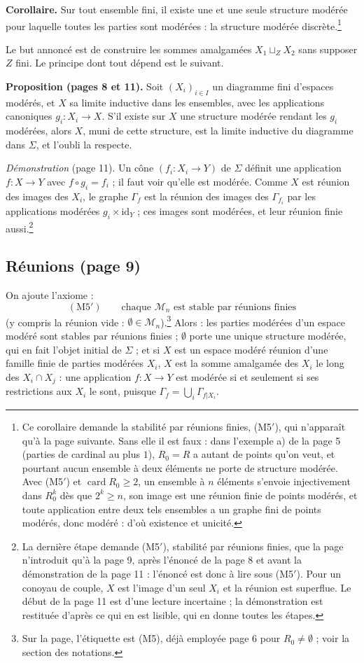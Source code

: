\documentclass[11pt,a4paper]{article}
\begin{document}
\textbf{Corollaire.} Sur tout ensemble fini, il existe une et une seule
structure modérée pour laquelle toutes les parties sont modérées : la
structure modérée discrète.\footnote{Ce corollaire demande la stabilité par
réunions finies, (M5$'$), qui n'apparaît qu'à la page suivante. Sans elle il
est faux : dans l'exemple a) de la page 5 (parties de cardinal au plus $1$),
$R_0 = R$ a autant de points qu'on veut, et pourtant aucun ensemble à deux
éléments ne porte de structure modérée. Avec (M5$'$) et $\operatorname{card}
R_0 \geqslant 2$, un ensemble à $n$ éléments s'envoie injectivement dans
$R_0^k$ dès que $2^k \geqslant n$, son image est une réunion finie de points
modérés, et toute application entre deux tels ensembles a un graphe fini de
points modérés, donc modéré : d'où existence et unicité.}

Le but annoncé est de construire les sommes amalgamées $X_1 \sqcup_Z X_2$ sans
supposer $Z$ fini. Le principe dont tout dépend est le suivant.

\textbf{Proposition (pages 8 et 11).} Soit $(X_i)_{i \in I}$ un diagramme fini
d'espaces modérés, et $X$ sa limite inductive dans les ensembles, avec les
applications canoniques $g_i : X_i \to X$. S'il existe sur $X$ une structure
modérée rendant les $g_i$ modérées, alors $X$, muni de cette structure, est la
limite inductive du diagramme dans $\Sigma$, et l'oubli la respecte.

\emph{Démonstration} (page 11). Un cône $(f_i : X_i \to Y)$ de $\Sigma$ définit
une application $f : X \to Y$ avec $f \circ g_i = f_i$ ; il faut voir qu'elle
est modérée. Comme $X$ est réunion des images des $X_i$, le graphe $\Gamma_f$
est la réunion des images des $\Gamma_{f_i}$ par les applications modérées $g_i
\times \mathrm{id}_Y$ ; ces images sont modérées, et leur réunion finie
aussi.\footnote{La dernière étape demande (M5$'$), stabilité par réunions
finies, que la page n'introduit qu'à la page 9, après l'énoncé de la page 8 et
avant la démonstration de la page 11 : l'énoncé est donc à lire sous (M5$'$).
Pour un conoyau de couple, $X$ est l'image d'un seul $X_i$ et la réunion est
superflue. Le début de la page 11 est d'une lecture incertaine ; la
démonstration est restituée d'après ce qui en est lisible, qui en donne
toutes les étapes.}

\subsection*{Réunions (page 9)}

On ajoute l'axiome :
\[ (\mathrm{M}5') \qquad \text{chaque } \mathcal{M}_n \text{ est stable par
réunions finies} \]
(y compris la réunion vide : $\emptyset \in \mathcal{M}_n$).\footnote{Sur la
page, l'étiquette est (M5), déjà employée page 6 pour $R_0 \neq \emptyset$ ;
voir la section des notations.} Alors : les parties modérées d'un espace
modéré sont stables par réunions finies ; $\emptyset$ porte une unique structure
modérée, qui en fait l'objet initial de $\Sigma$ ; et si $X$ est un espace
modéré réunion d'une famille finie de parties modérées $X_i$, $X$ est la somme
amalgamée des $X_i$ le long des $X_i \cap X_j$ : une application $f : X \to Y$
est modérée si et seulement si ses restrictions aux $X_i$ le sont, puisque
$\Gamma_f = \bigcup_i \Gamma_{f|X_i}$.
\end{document}

